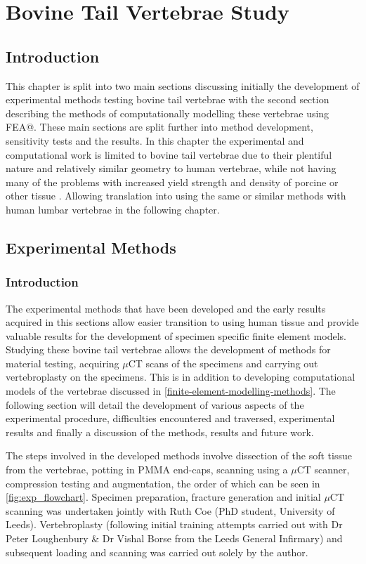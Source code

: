 \chapter{Bovine Tail Vertebrae Study}\label{chap_bov}

\section{Introduction}

This chapter is split into two main sections discussing initially the
development of experimental methods testing bovine tail vertebrae with the
second section describing the methods of computationally modelling these
vertebrae using FEA@. These main sections are split further into method
development, sensitivity tests and the results. In this chapter the
experimental and computational work is limited to bovine tail vertebrae due to
their plentiful nature and relatively similar geometry to human vertebrae,
while not having many of the problems with increased yield strength and density
of porcine or other tissue \cite{zapata2017methodology}.  Allowing translation
into using the same or similar methods with human lumbar vertebrae in the
following chapter.

\section{Experimental Methods}\label{experimental-methods}


\subsection{Introduction}

The experimental methods that have been developed and the early results
acquired in this sections allow easier transition to using human tissue  and
provide valuable results for the development of specimen specific finite
element models. Studying these bovine tail vertebrae allows the development of
methods for material testing, acquiring $\mu$CT scans of the specimens and
carrying out vertebroplasty on the specimens. This is in addition to developing
computational models of the vertebrae discussed in
\cref{finite-element-modelling-methods}. The following section will detail the
development of various aspects of the experimental procedure, difficulties
encountered and traversed, experimental results and finally a discussion of the
methods, results and future work.

The steps involved in the developed methods involve dissection of the soft
tissue from the vertebrae, potting in PMMA end-caps, scanning using a $\mu$CT
scanner, compression testing and augmentation, the order of which can be seen
in \cref{fig:exp_flowchart}.  Specimen preparation, fracture generation and
initial $\mu$CT scanning was undertaken jointly with Ruth Coe (PhD student,
University of Leeds). Vertebroplasty (following initial training attempts
carried out with Dr Peter Loughenbury \& Dr Vishal Borse from the Leeds General
Infirmary) and subsequent loading and scanning was carried out solely by the
author.

